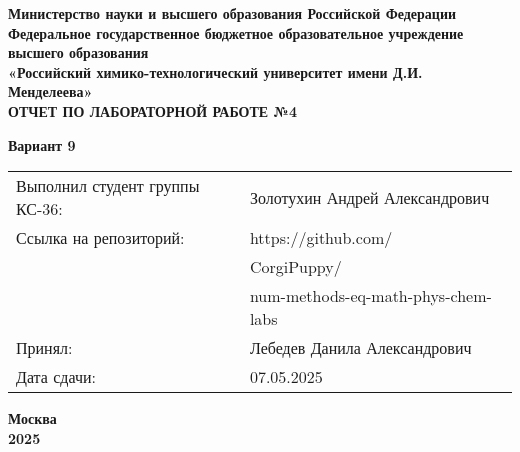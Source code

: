 \documentclass[12pt, a4paper]{report}
\begin{document}
	\begin{titlepage}
		\begin{center}
			\large \textbf{Министерство науки и высшего образования Российской Федерации} \\
			\large \textbf{Федеральное государственное бюджетное образовательное учреждение высшего образования} \\
			\large \textbf{«Российский химико-технологический университет имени Д.И. Менделеева»} \\

			\vspace*{4cm}
			\LARGE \textbf{ОТЧЕТ ПО ЛАБОРАТОРНОЙ РАБОТЕ №4}

			\vspace*{1cm}
			\LARGE \textbf{Вариант 9}

			\vspace*{4cm}
			\begin{flushright}
				\Large
				\begin{tabular}{>{\raggedleft\arraybackslash}p{9cm} p{10cm}}
					Выполнил студент группы КС-36: & Золотухин Андрей Александрович \\
					Ссылка на репозиторий: & https://github.com/ \\
					& CorgiPuppy/ \\
					& num-methods-eq-math-phys-chem-labs \\
					Принял: & Лебедев Данила Александрович \\
					Дата сдачи: & 07.05.2025 \\
				\end{tabular}
			\end{flushright}

			\vspace*{4cm}
			\Large \textbf{Москва \\ 2025}
		\end{center}
	\end{titlepage}

	\tableofcontents
	\thispagestyle{empty}
	\newpage

\end{document}
